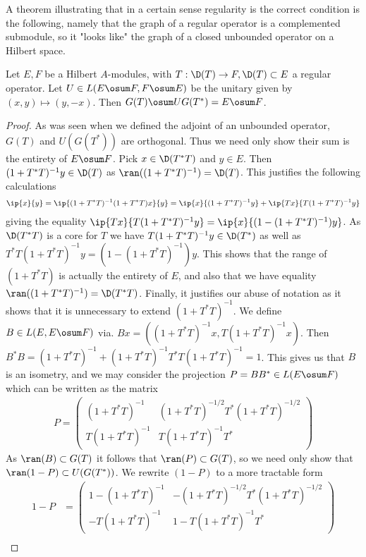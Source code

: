 A theorem illustrating that in a certain sense regularity is the correct condition is the following, namely that the graph of a regular operator is a complemented submodule, so it "looks like" the graph of a closed unbounded operator on a Hilbert space. 
\begin{theorem}\label{lance93}
	Let $E,F$ be a Hilbert $A$-modules, with $T:\D(T)\to F,\D(T)\subset E$ a regular operator. Let $U\in L(E\osum F,F\osum E)$ be the unitary given by $(x,y)\mapsto (y,-x)$. Then $G(T)\osum UG(T^*)=E\osum F$. 
\end{theorem}
\begin{proof}
	As was seen when we defined the adjoint of an unbounded operator, $G(T)$ and $U(G(T^*))$ are orthogonal. Thus we need only show their sum is the entirety of $E\osum F$. 
	Pick $x\in \D(T^*T)$ and $y\in E$. Then $(1+T^*T)^{-1}y\in \D(T)$ as $\ran((1+T^*T)^{-1})=\D(T)$. This justifies the following calculations
	\begin{align*}
		\ip{x}{y}=\ip{(1+T^*T)^{-1}(1+T^*T)x}{y}=\ip{x}{(1+T^*T)^{-1}y}+\ip{Tx}{T(1+T^*T)^{-1}y}
	\end{align*}
	giving the equality $\ip{Tx}{T(1+T^*T)^{-1}y}=\ip{x}{(1-(1+T^*T)^{-1})y}$. As $\D(T^*T)$ is a core for $T$ we have $T(1+T^*T)^{-1}y\in \D(T^*)$ as well as $T^*T(1+T^*T)^{-1}y=(1-(1+T^*T)^{-1})y$. This shows that the range of $(1+T^*T)$ is actually the entirety of $E$, and also that we have equality $\ran((1+T^*T)^{-1})=\D(T^*T)$. Finally, it justifies our abuse of notation as it shows that it is unnecessary to extend $(1+T^*T)^{-1}$. 
	We define $B\in L(E,E\osum F)$ via. $Bx=((1+T^*T)^{-1}x,T(1+T^*T)^{-1}x)$. Then $B^*B=(1+T^*T)^{-1}+(1+T^*T)^{-1}T^*T(1+T^*T)^{-1}=1$. This gives us that $B$ is an isometry, and we may consider the projection $P=BB^*\in L(E\osum F)$ which can be written as the matrix
	\begin{align*}
		P=\begin{pmatrix} (1+T^*T)^{-1}  & (1+T^*T)^{-1/2}T^*(1+T^*T)^{-1/2} \\ T(1+T^*T)^{-1} & T(1+T^*T)^{-1}T^*\end{pmatrix}
	\end{align*}
	As $\ran(B)\subset G(T)$ it follows that $\ran(P)\subset G(T)$, so we need only show that $\ran(1-P)\subset U(G(T^*))$.
	We rewrite $(1-P)$ to a more tractable form
	\begin{align*}
		1-P&=\begin{pmatrix} 1-(1+T^*T)^{-1} & -(1+T^*T)^{-1/2}T^*(1+T^*T)^{-1/2} \\ -T(1+T^*T)^{-1} & 1-T(1+T^*T)^{-1}T^*\end{pmatrix} \\

\end{align*}
\end{proof}
